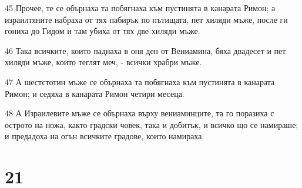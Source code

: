 \par 45 Прочее, те се обърнаха та побягнаха към пустинята в канарата Римон; а израилтяните набраха от тях пабирък по пътищата, пет хиляди мъже, после ги гониха до Гидом и там убиха от тях две хиляди мъже.
\par 46 Така всичките, които паднаха в оня ден от Вениамина, бяха двадесет и пет хиляди мъже, които теглят меч, - всички храбри мъже.
\par 47 А шестстотин мъже се обърнаха та побягнаха към пустинята в канарата Римон; и седяха в канарата Римон четири месеца.
\par 48 А Израилевите мъже се обърнаха върху вениаминците, та го поразиха с острото на ножа, както градски човек, така и добитък, и всичко що се намираше; и предадоха на огън всичките градове, които намираха.

\chapter{21}

